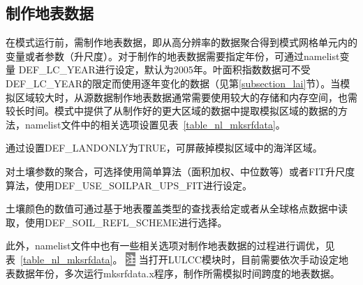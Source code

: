 \documentclass[a4paper,12pt,twoside]{article}
\begin{document}
\subsection{制作地表数据}

在模式运行前，需制作地表数据，即从高分辨率的数据聚合得到模式网格单元内的变量或者参数（升尺度）。对于制作的地表数据需要指定年份，可通过namelist变量 DEF\_LC\_YEAR进行设定，默认为2005年。叶面积指数数据可不受DEF\_LC\_YEAR的限定而使用逐年变化的数据（见第\ref{subsection_lai}节）。当模拟区域较大时，从源数据制作地表数据通常需要使用较大的存储和内存空间，也需较长时间。模式中提供了从制作好的更大区域的数据中提取模拟区域的数据的方法，namelist文件中的相关选项设置见表~\ref{table_nl_mksrfdata}。

通过设置DEF\_LANDONLY为TRUE，可屏蔽掉模拟区域中的海洋区域。

对土壤参数的聚合，可选择使用简单算法（面积加权、中位数等）或者FIT升尺度算法，使用DEF\_USE\_SOILPAR\_UPS\_FIT进行设定。

土壤颜色的数值可通过基于地表覆盖类型的查找表给定或者从全球格点数据中读取，使用DEF\_SOIL\_REFL\_SCHEME进行选择。

此外，namelist文件中也有一些相关选项对制作地表数据的过程进行调优，见表~\ref{table_nl_mksrfdata}。
\newline
\newline
\noindent \colorbox{gray}{\textcolor{white}{\bf{注}}} 当打开LULCC模块时，目前需要依次手动设定地表数据年份，多次运行mksrfdata.x程序，制作所需模拟时间跨度的地表数据。
\end{document}
